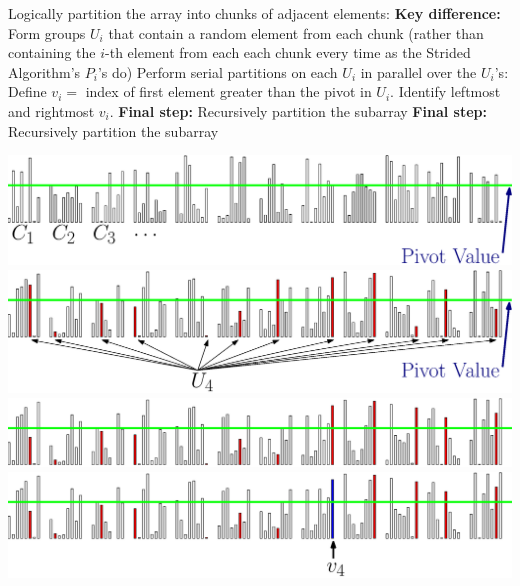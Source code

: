 \documentclass[xcolor=x11names, svgnames, rgb]{beamer}
\begin{document}
\begin{frame}[t]{}%
	\vspace{0.25cm}
	\begin{overprint}
	Logically partition the array into chunks of adjacent elements:
	\onslide<2>\textbf{Key difference:} Form groups $U_i$ that contain a random element from each chunk (rather than containing the $i$-th element from each each chunk every time as the Strided Algorithm's $P_i$'s do)
	\onslide<3>Perform serial partitions on each $U_i$ in parallel over the $U_i$'s:
	\onslide<4>Define $v_i = $ index of first element greater than the pivot in $U_i$. 
	\onslide<5>Identify leftmost and rightmost $v_i$.
	\onslide<6>\textbf{Final step:} Recursively partition the subarray
	\onslide<7>\textbf{Final step:} Recursively partition the subarray
	\end{overprint}
	\vspace{0.25cm}
	\begin{overprint}
	\includegraphics[width=\linewidth]{imgs/smoothedAlgSim/smoothedAlgSim_1.eps}
	\onslide<2>\includegraphics[width=\linewidth]{imgs/smoothedAlgSim/smoothedAlgSim_2.eps}
	\onslide<3>\includegraphics[width=\linewidth]{imgs/smoothedAlgSim/smoothedAlgSim_3.eps}
	\onslide<4>\includegraphics[width=\linewidth]{imgs/smoothedAlgSim/smoothedAlgSim_35.eps}

\end{overprint}
\end{frame}
\end{document}
